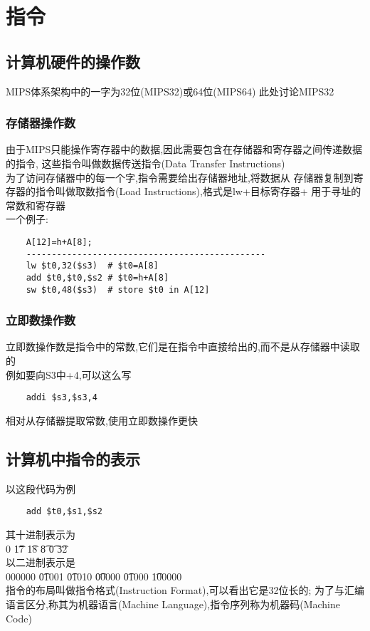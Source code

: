 \section{指令}
\subsection{计算机硬件的操作数}
MIPS体系架构中的一字为32位(MIPS32)或64位(MIPS64) 此处讨论MIPS32\\
\subsubsection{存储器操作数}
由于MIPS只能操作寄存器中的数据,因此需要包含在存储器和寄存器之间传递数据的指令,
这些指令叫做数据传送指令(Data Transfer Instructions)\\
为了访问存储器中的每一个字,指令需要给出存储器地址,将数据从
存储器复制到寄存器的指令叫做取数指令(Load Instructions),格式是lw+目标寄存器+
用于寻址的常数和寄存器\\
一个例子:\\
\begin{lstlisting}
    A[12]=h+A[8];
    -----------------------------------------------
    lw $t0,32($s3)  # $t0=A[8]
    add $t0,$t0,$s2 # $t0=h+A[8]
    sw $t0,48($s3)  # store $t0 in A[12]
\end{lstlisting}
\subsubsection{立即数操作数}
立即数操作数是指令中的常数,它们是在指令中直接给出的,而不是从存储器中读取的\\
例如要向S3中+4,可以这么写
\begin{lstlisting}
    addi $s3,$s3,4
\end{lstlisting}
相对从存储器提取常数,使用立即数操作更快\\
\subsection{计算机中指令的表示}
以这段代码为例
\begin{lstlisting}
    add $t0,$s1,$s2
\end{lstlisting}
其十进制表示为\\
0 \t 17 \t 18 \t 8 \t 0 \t 32 \\
以二进制表示是\\
000000 \t 01001 \t 01010 \t 00000 \t 01000 \t 100000 \\
指令的布局叫做指令格式(Instruction Format),可以看出它是32位长的;
为了与汇编语言区分,称其为机器语言(Machine Language),指令序列称为机器码(Machine Code)\\
